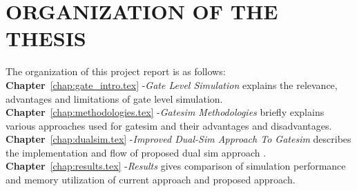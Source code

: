 \section{ORGANIZATION OF THE THESIS}
The organization of this project report is as follows:\\
\noindent 
{\bf Chapter}~\ref{chap:gate_intro.tex} -{\it Gate Level Simulation} explains the relevance, advantages and limitations of gate level simulation.\\
{\bf Chapter}~\ref{chap:methodologies.tex} -{\it Gatesim Methodologies} briefly explains various approaches used for gatesim and their advantages and disadvantages.\\
{\bf Chapter}~\ref{chap:dualsim.tex} -{\it Improved Dual-Sim Approach To Gatesim} describes the implementation and flow of proposed dual sim approach .\\
{\bf Chapter}~\ref{chap:results.tex} -{\it Results} gives comparison of simulation performance and memory utilization of current approach and proposed approach.\\

